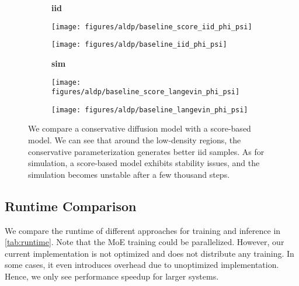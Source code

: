 \begin{figure}[h]
    \centering
    \begin{minipage}{\textwidth}
        \centering
        \begin{subfigure}[c]{0.08\textwidth}
            \textbf{iid}
        \end{subfigure}
        \begin{subfigure}[c]{0.2\textwidth}
            \centering
            \texttt{[image: figures/aldp/baseline\_score\_iid\_phi\_psi]}
        \end{subfigure}
        \hspace{0.5cm}
        \begin{subfigure}[c]{0.2\textwidth}
            \centering
            \texttt{[image: figures/aldp/baseline\_iid\_phi\_psi]}
        \end{subfigure}
    \end{minipage}
    \vspace{0.5cm}
    \begin{minipage}{\textwidth}
        \centering
        \begin{subfigure}[c]{0.08\textwidth}
            \vspace{-0.5cm}
            \textbf{sim}
        \end{subfigure}
        \begin{subfigure}[c]{0.2\textwidth}
            \centering
            \texttt{[image: figures/aldp/baseline\_score\_langevin\_phi\_psi]}
        \end{subfigure}
        \hspace{0.5cm}
        \begin{subfigure}[c]{0.2\textwidth}
            \centering
            \texttt{[image: figures/aldp/baseline\_langevin\_phi\_psi]}
        \end{subfigure}
    \end{minipage}
    \caption{We compare a conservative diffusion model with a score-based model. We can see that around the low-density regions, the conservative parameterization generates better iid samples. As for simulation, a score-based model exhibits stability issues, and the simulation becomes unstable after a few thousand steps.}
    \label{fig:conservative-vs-score}
\end{figure}


\subsection{Runtime Comparison} \label{appx:runtime}
We compare the runtime of different approaches for training and inference in \cref{tab:runtime}. Note that the \gls{MoE} training could be parallelized. However, our current implementation is not optimized and does not distribute any training. In some cases, it even introduces overhead due to unoptimized implementation. Hence, we only see performance speedup for larger systems.


